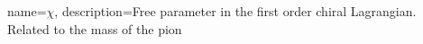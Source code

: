 \usepackage{glossaries}

\makenoidxglossaries

{
    name={$\chi$},
    description={Free parameter in the first order chiral Lagrangian. Related to the mass of the pion}
}
